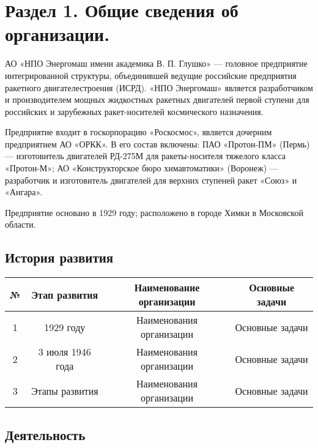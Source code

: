 \section{Раздел 1. Общие сведения об организации.}

АО «НПО Энергомаш имени академика В. П. Глушко» — головное предприятие интегрированной структуры, объединившей ведущие российские предприятия ракетного двигателестроения (ИСРД). «НПО Энергомаш» является разработчиком и производителем мощных жидкостных ракетных двигателей первой ступени для российских и зарубежных ракет-носителей космического назначения.

Предприятие входит в госкорпорацию «Роскосмос», является дочерним предприятием АО «ОРКК». В его состав включены: ПАО «Протон-ПМ» (Пермь) — изготовитель двигателей РД-275М для ракеты-носителя тяжелого класса «Протон-М»; АО «Конструкторское бюро химавтоматики» (Воронеж) — разработчик и изготовитель двигателей для верхних ступеней ракет «Союз» и «Ангара».

Предприятие основано в 1929 году; расположено в городе Химки в Московской области.

\subsection{История развития}

\begin{tabular}{|c|c|c|c|}
\hline
№ & Этап развития & Наименование организации & Основные задачи\\
\hline
1 & 1929 году & Наименования организации & Основные задачи\\
\hline
2 & 3 июля 1946 года & Наименования организации & Основные задачи\\
\hline
3 & Этапы развития & Наименования организации & Основные задачи\\
\hline
\end{tabular}

\subsection{Деятельность}

\pagebreak